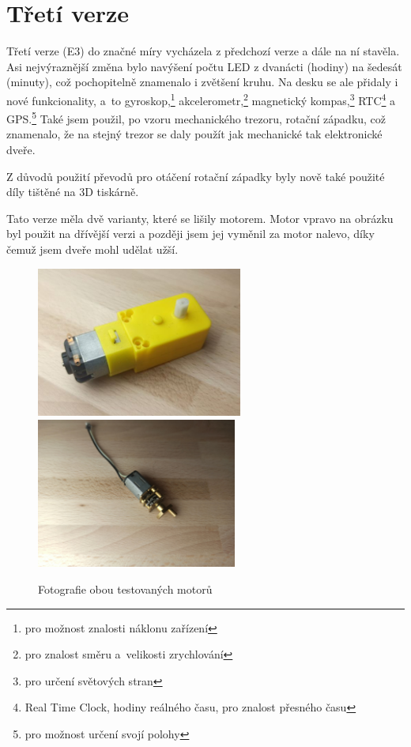 \section{Třetí verze}
\label{E3-vyvoj}

Třetí verze (E3) do značné míry vycházela z předchozí verze a dále na ní stavěla. Asi nejvýraznější změna bylo navýšení počtu 
LED z dvanácti (hodiny) na šedesát (minuty), což pochopitelně znamenalo i zvětšení kruhu. Na desku se ale přidaly i nové funkcionality,
a~to gyroskop,\footnote{pro možnost znalosti náklonu zařízení} akcelerometr,\footnote{pro znalost směru a~velikosti zrychlování} magnetický kompas,\footnote{pro určení světových
stran} RTC\footnote{Real Time Clock, hodiny reálného času, pro znalost přesného času} a GPS.\footnote{pro možnost určení svojí polohy}
Také jsem použil, po vzoru mechanického trezoru, rotační západku, což znamenalo, že na stejný trezor se daly použít jak mechanické tak 
elektronické dveře.

Z důvodů použití převodů pro otáčení rotační západky byly nově také použité díly tištěné na 3D tiskárně. 

Tato verze měla dvě varianty, které se lišily motorem.
Motor vpravo na obrázku  byl použit na dřívější verzi a později jsem jej vyměnil za motor nalevo, díky čemuž jsem dveře mohl udělat užší. %
\begin{figure}[htbp]
    \centering
    \includegraphics[height=140pt]{kapitoly/obrazky/E3/motory/zluty_motor.jpg}
    \includegraphics[height=140pt]{kapitoly/obrazky/E3/motory/hodinovyStrojek.jpg}
    \caption{Fotografie obou testovaných motorů} 
    \label{fig:E3-motory}
\end{figure}

\newpage
